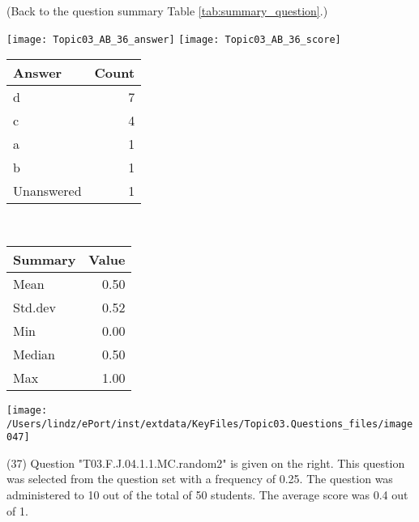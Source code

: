 \documentclass[12pt,english,nohyper]{tufte-handout}\usepackage[]{graphicx}\usepackage[]{color}
\begin{document}
 (Back to the question summary Table \ref{tab:summary_question}.)

\begin{center} \texttt{[image: Topic03\_AB\_36\_answer]} \texttt{[image: Topic03\_AB\_36\_score]} \end{center} 

\begin{center}%
\begin{tabular}{lr}
  \hline
Answer & Count \\ 
  \hline
d &   7 \\ 
  c &   4 \\ 
  a &   1 \\ 
  b &   1 \\ 
  Unanswered &   1 \\ 
   \hline
\end{tabular}
~~~~~~~~%
\begin{tabular}{lr}
  \hline
Summary & Value \\ 
  \hline
Mean & 0.50 \\ 
  Std.dev & 0.52 \\ 
  Min & 0.00 \\ 
  Median & 0.50 \\ 
  Max & 1.00 \\ 
   \hline
\end{tabular}
\end{center}\newpage{}



\vspace{4cm}\begin{marginfigure}\texttt{[image: /Users/lindz/ePort/inst/extdata/KeyFiles/Topic03.Questions\_files/image047]}\end{marginfigure}\vspace{-4cm} (37) Question "T03.F.J.04.1.1.MC.random2" is given on the right. This question was selected from the question set with a frequency of 0.25. The question was administered to 10 out of the total of 50 students. The average score was 0.4 out of 1.
\end{document}
